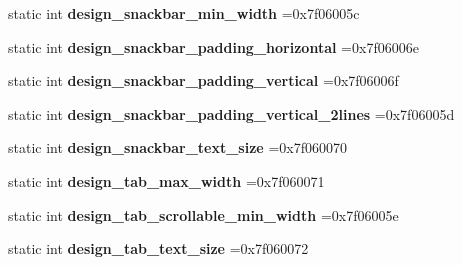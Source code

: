 \begin{DoxyCompactItemize}
\item 
\mbox{\label{classandroid_1_1support_1_1v4_1_1R_1_1dimen_ab08c4d2ae38296ad063dc2dd09916eb7}} 
static int {\bfseries design\+\_\+snackbar\+\_\+min\+\_\+width} =0x7f06005c
\item 
\mbox{\label{classandroid_1_1support_1_1v4_1_1R_1_1dimen_a57fa77ab974a10cd8f40447bd390813e}} 
static int {\bfseries design\+\_\+snackbar\+\_\+padding\+\_\+horizontal} =0x7f06006e
\item 
\mbox{\label{classandroid_1_1support_1_1v4_1_1R_1_1dimen_a258677e266c5a3dfec59567d27167b88}} 
static int {\bfseries design\+\_\+snackbar\+\_\+padding\+\_\+vertical} =0x7f06006f
\item 
\mbox{\label{classandroid_1_1support_1_1v4_1_1R_1_1dimen_ac6188ce262db03170d965e0c474e6a05}} 
static int {\bfseries design\+\_\+snackbar\+\_\+padding\+\_\+vertical\+\_\+2lines} =0x7f06005d
\item 
\mbox{\label{classandroid_1_1support_1_1v4_1_1R_1_1dimen_a0a03ba38c869546e3ebb2f7caa057426}} 
static int {\bfseries design\+\_\+snackbar\+\_\+text\+\_\+size} =0x7f060070
\item 
\mbox{\label{classandroid_1_1support_1_1v4_1_1R_1_1dimen_a2f65a3bca20ccffebc62fa466db77bf2}} 
static int {\bfseries design\+\_\+tab\+\_\+max\+\_\+width} =0x7f060071
\item 
\mbox{\label{classandroid_1_1support_1_1v4_1_1R_1_1dimen_a96861a03071ee5f7ee96557dcacf5a2a}} 
static int {\bfseries design\+\_\+tab\+\_\+scrollable\+\_\+min\+\_\+width} =0x7f06005e
\item 
\mbox{\label{classandroid_1_1support_1_1v4_1_1R_1_1dimen_a72e7ccd885cd6b619d600260e93aff1c}} 
static int {\bfseries design\+\_\+tab\+\_\+text\+\_\+size} =0x7f060072
\item 
\mbox{\label{classandroid_1_1support_1_1v4_1_1R_1_1dimen_ab244d58a09ab7fd1647e60b096b9743b}} 

\end{DoxyCompactItemize}
